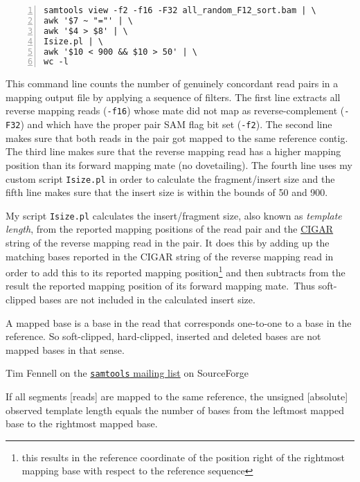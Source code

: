 \documentclass[a4paper,12pt,times,authoryear,twoside,print,index]{Classes/PhDThesisPSnPDF}\usepackage[]{graphicx}\usepackage[]{color}
\begin{document}
\begin{cmd}
\captionsetup{type=cmd}
\begin{Verbatim}[fontsize=\scriptsize, formatcom=\color{darkgray}, numbers=left]
samtools view -f2 -f16 -F32 all_random_F12_sort.bam | \
awk '$7 ~ "="' | \
awk '$4 > $8' | \
Isize.pl | \
awk '$10 < 900 && $10 > 50' | \
wc -l 
\end{Verbatim}
\caption{
\small This command line counts the number of genuinely \gls{concordant} read pairs in a mapping output file by applying a sequence of filters. The first line extracts all reverse mapping reads (\texttt{-f16}) whose mate did not map as reverse-complement (\texttt{-F32}) and which have the proper pair SAM flag bit set (\texttt{-f2}). The second line makes sure that both reads in the pair got mapped to the same reference contig. The third line makes sure that the reverse mapping read has a higher mapping position than its forward mapping mate (no dovetailing). The fourth line uses my custom script \texttt{Isize.pl} in order to calculate the fragment/insert size and the fifth line makes sure that the insert size is within the bounds of 50 and 900.
}
\label{cmd:count_genuine_proper_pairs}
\end{cmd}
%
My script \texttt{Isize.pl} calculates the insert/fragment size, also known as \emph{template length}, from the reported mapping positions of the read pair and the \href{http://samtools.github.io/hts-specs/SAMv1.pdf}{CIGAR} string of the reverse mapping read in the pair. It does this by adding up the matching bases reported in the CIGAR string of the reverse mapping read in order to add this to its reported mapping position\footnote{this results in the reference coordinate of the position right of the rightmost mapping base with respect to the reference sequence} and then subtracts from the result the reported mapping position of its forward mapping mate.\todo{include a drawing here, use tikz package}~Thus soft-clipped bases are not included in the calculated insert size.
%
\renewcommand{\epigraphflush}{center}
\setlength{\epigraphwidth}{.9\textwidth}
\setlength{\epigraphrule}{0pt}
%
{\mdseries
\epigraph{
A mapped base is a base in the read that corresponds one-to-one to a base in the reference.  So soft-clipped, hard-clipped, inserted and deleted bases are not mapped bases in that sense.
}
{Tim Fennell on the \href{http://sourceforge.net/p/samtools/mailman/message/28656712/}{\texttt{samtools} mailing list} on SourceForge}
%
\epigraph{
If all segments [reads] are mapped to the same reference, the unsigned [absolute] observed template length equals the number of bases from the leftmost mapped base to the rightmost mapped base.
}
{\cite{SAMformatSpec2011}}
}
\end{document}
